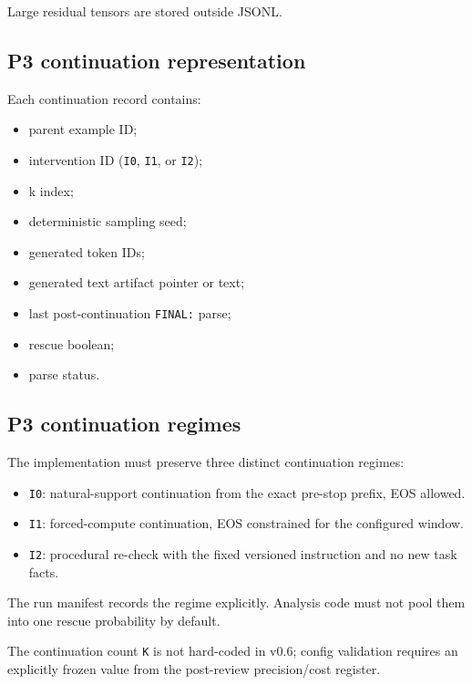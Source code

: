 Large residual tensors are stored outside JSONL.

\subsection{P3 continuation representation}\label{p3-continuation-representation}

Each continuation record contains:

\begin{itemize}
\tightlist
\item
  parent example ID;
\item
  intervention ID (\passthrough{\lstinline!I0!}, \passthrough{\lstinline!I1!}, or \passthrough{\lstinline!I2!});
\item
  k index;
\item
  deterministic sampling seed;
\item
  generated token IDs;
\item
  generated text artifact pointer or text;
\item
  last post-continuation \passthrough{\lstinline!FINAL:!} parse;
\item
  rescue boolean;
\item
  parse status.
\end{itemize}

\subsection{P3 continuation regimes}\label{p3-continuation-regimes}

The implementation must preserve three distinct continuation regimes:

\begin{itemize}
\tightlist
\item \passthrough{\lstinline!I0!}: natural-support continuation from the exact pre-stop prefix, EOS allowed.
\item \passthrough{\lstinline!I1!}: forced-compute continuation, EOS constrained for the configured window.
\item \passthrough{\lstinline!I2!}: procedural re-check with the fixed versioned instruction and no new task facts.
\end{itemize}

The run manifest records the regime explicitly. Analysis code must not pool them into one rescue probability by default.

The continuation count \passthrough{\lstinline!K!} is not hard-coded in v0.6; config validation requires an explicitly frozen value from the post-review precision/cost register.

